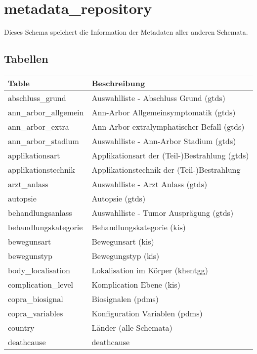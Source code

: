   \section{metadata\_repository}
  Dieses Schema speichert die Information der Metadaten aller anderen Schemata.
  
  \subsection{Tabellen}
  
  \begin{longtable}{||p{6cm}|p{7.8cm}||}
  	\hline Table & Beschreibung \\ \hline \hline
  	abschluss\_grund & Auswahlliste - Abschluss Grund (\ac{gtds}) \\ \hline
  	ann\_arbor\_allgemein & Ann-Arbor Allgemeinsymptomatik (\ac{gtds}) \\ \hline
  	ann\_arbor\_extra & Ann-Arbor extralymphatischer Befall (\ac{gtds}) \\ \hline
  	ann\_arbor\_stadium & Auswahlliste - Ann-Arbor Stadium (\ac{gtds}) \\ \hline
  	applikationsart & Applikationsart der (Teil-)Bestrahlung (\ac{gtds}) \\ \hline
  	applikationstechnik & Applikationstechnik der (Teil-)Bestrahlung\\ \hline
  	arzt\_anlass & Auswahlliste - Arzt Anlass (\ac{gtds})\\ \hline
  	autopsie & Autopsie (\ac{gtds}) \\ \hline
  	behandlungsanlass & Auswahlliste - Tumor Ausprägung (\ac{gtds}) \\ \hline
  	behandlungskategorie & Behandlungskategorie (\ac{kis}) \\ \hline
  	bewegunsart & Bewegunsart (\ac{kis})\\ \hline
  	bewegunstyp & Bewegungstyp (\ac{kis}) \\ \hline
  	body\_localisation & Lokalisation im Körper (\ac{khentgg})\\ \hline
  	complication\_level & Komplication Ebene (\ac{kis}) \\ \hline
  	copra\_biosignal & Biosignalen (\ac{pdms}) \\ \hline
  	copra\_variables & Konfiguration Variablen (\ac{pdms}) \\ \hline
  	country & Länder (alle Schemata) \\ \hline
  	deathcause & deathcause\\ \hline

\end{longtable}

